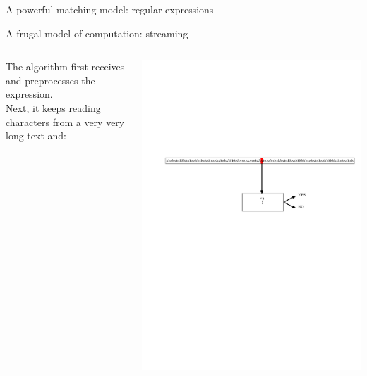 \begin{frame}{A powerful matching model: regular expressions}
    \bigskip
    \pause
    \bigskip
\end{frame}

\begin{frame}{A frugal model of computation: streaming}
\begin{columns}
    The algorithm first receives and preprocesses the expression.\\ Next, it keeps reading characters from a very very long text and:
    \begin{center}
        \includegraphics[width=\textwidth]{pictures/stream3}
    \end{center}
\end{columns}


\end{frame}
